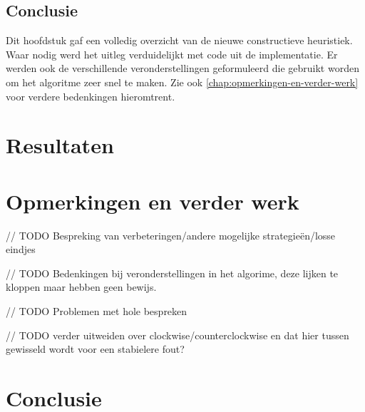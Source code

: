 \documentclass[12pt,a4paper,oneside]{book}
\begin{document}
\section{Conclusie}

Dit hoofdstuk gaf een volledig overzicht van de nieuwe constructieve heuristiek.
Waar nodig werd het uitleg verduidelijkt met code uit de implementatie.
Er werden ook de verschillende veronderstellingen geformuleerd die gebruikt worden om het algoritme zeer snel te maken.
Zie ook \autoref{chap:opmerkingen-en-verder-werk} voor verdere bedenkingen hieromtrent.

\chapter{Resultaten} \label{chap:resultaten}


\chapter{Opmerkingen en verder werk} \label{chap:opmerkingen-en-verder-werk}

// TODO Bespreking van verbeteringen/andere mogelijke strategieën/losse eindjes

// TODO Bedenkingen bij veronderstellingen in het algorime, deze lijken te kloppen maar hebben geen bewijs.

// TODO Problemen met hole bespreken

// TODO verder uitweiden over clockwise/counterclockwise en dat hier tussen gewisseld wordt voor een stabielere fout?

\chapter{Conclusie} \label{chap:conclusie}


\newpage




\newpage
\end{document}
